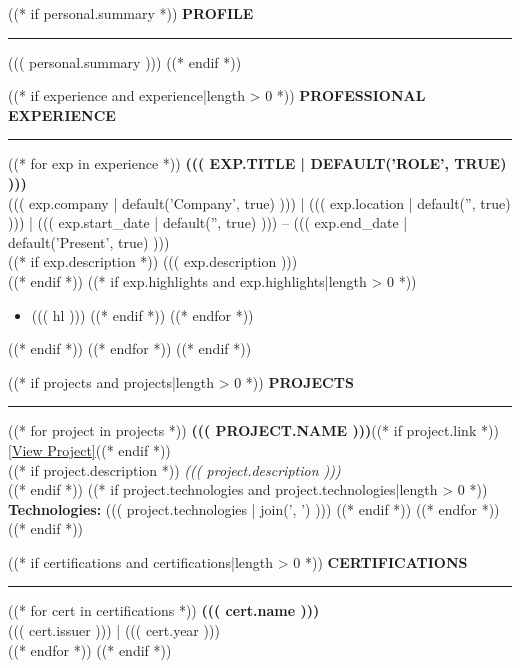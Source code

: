 \documentclass[11pt,a4paper]{article}
\newcommand{\sectiontitle}[1]{%
  {\fontsize{10}{12}\selectfont\bfseries\MakeUppercase{#1}}\\[-2pt]
  \rule{\linewidth}{0.4pt}\vspace{4pt}
}
\begin{document}
\begin{minipage}[t]{0.65\textwidth}
\hspace{2mm}
\begin{minipage}[t]{0.92\textwidth}
\vspace{0pt}

((* if personal.summary *))
\sectiontitle{Profile}
{\small ((( personal.summary )))}
\vspace{9pt}
((* endif *))

((* if experience and experience|length > 0 *))
\sectiontitle{Professional Experience}
((* for exp in experience *))
{\small\bfseries\MakeUppercase{((( exp.title | default('Role', true) )))}}\\
{\small\color{muted} ((( exp.company | default('Company', true) ))) | ((( exp.location | default('', true) ))) | ((( exp.start_date | default('', true) ))) -- ((( exp.end_date | default('Present', true) )))}\\
((* if exp.description *))
{\small ((( exp.description )))}\\
((* endif *))
((* if exp.highlights and exp.highlights|length > 0 *))
\begin{itemize}[leftmargin=16pt, itemsep=2pt, parsep=0pt, topsep=4pt]
((* for hl in exp.highlights *))
((* if hl *))
\item {\small ((( hl )))}
((* endif *))
((* endfor *))
\end{itemize}
((* endif *))
\vspace{8pt}
((* endfor *))
((* endif *))

((* if projects and projects|length > 0 *))
\sectiontitle{Projects}
((* for project in projects *))
{\small\bfseries\MakeUppercase{((( project.name )))}}((* if project.link *)) \hfill {\scriptsize\href{((* if 'http' not in project.link *))https://((* endif *))((( project.link )))}{[View Project]}}((* endif *))\\
((* if project.description *))
{\small\textit{((( project.description )))}}\\
((* endif *))
((* if project.technologies and project.technologies|length > 0 *))
{\small\textbf{Technologies:} ((( project.technologies | join(', ') )))}
((* endif *))
\vspace{6pt}
((* endfor *))
((* endif *))

((* if certifications and certifications|length > 0 *))
\sectiontitle{Certifications}
((* for cert in certifications *))
{\small\bfseries ((( cert.name )))}\\
{\small\color{muted} ((( cert.issuer ))) | ((( cert.year )))}\\[6pt]
((* endfor *))
((* endif *))

\end{minipage}
\end{minipage}
\end{document}
